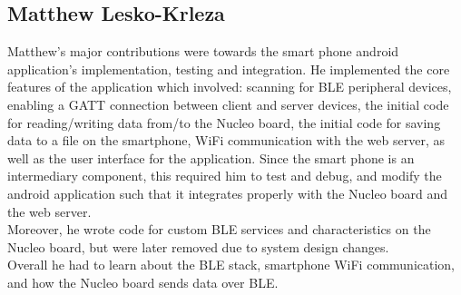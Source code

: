 \subsection*{Matthew Lesko-Krleza}
Matthew's major contributions were towards the smart phone android application's implementation, testing and integration. 
He implemented the core features of the application which involved: scanning for BLE peripheral devices, enabling
a GATT connection between client and server devices, the initial code for reading/writing data from/to the Nucleo
board, the initial code for saving data to a file on the smartphone, WiFi communication with the web server, as well as
the user interface for the application. Since the smart phone is an intermediary component, this required him to test and 
debug, and modify the android application such that it integrates properly with the Nucleo board and the web server.\\
Moreover, he wrote code for custom BLE services and characteristics on the Nucleo board, but were later removed due to 
system design changes.\\
Overall he had to learn about the BLE stack, smartphone WiFi communication, and how the Nucleo board sends data over BLE.